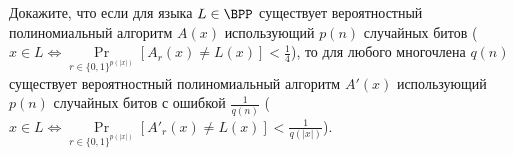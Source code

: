 Докажите, что если для языка $L \in \BPP$ существует вероятностный полиномиальный алгоритм $A(x)$ использующий $p(n)$
случайных битов ($x \in L \Leftrightarrow \Pr\limits_{r \in \{0, 1\}^{p(|x|)}}[A_r(x) \neq L(x)] < \frac{1}{4}$), то для
любого многочлена $q(n)$ существует вероятностный полиномиальный алгоритм $A'(x)$ использующий $p(n)$ случайных битов с
ошибкой $\frac{1}{q(n)}$ ($x \in L \Leftrightarrow \Pr\limits_{r \in \{0, 1\}^{p(|x|)}}[A'_r(x) \neq L(x)] <
\frac{1}{q(|x|)}$).